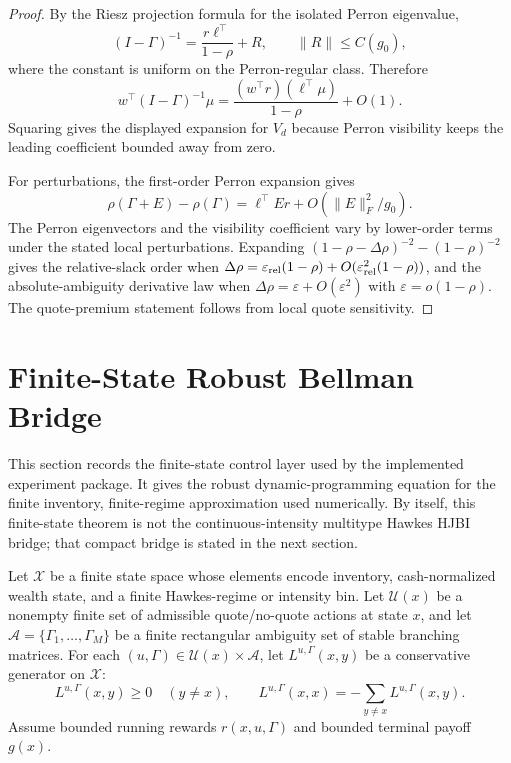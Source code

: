 \documentclass[11pt]{article}
\newcommand{\eps}{\varepsilon}
\begin{document}
\begin{proof}
By the Riesz projection formula for the isolated Perron eigenvalue,
\[
(I-\Gamma)^{-1}=\frac{r\ell^\top}{1-\rho}+R,
\qquad \|R\|\le C(g_0),
\]
where the constant is uniform on the Perron-regular class. Therefore
\[
w^\top(I-\Gamma)^{-1}\mu
=\frac{(w^\top r)(\ell^\top\mu)}{1-\rho}+O(1).
\]
Squaring gives the displayed expansion for $V_d$ because Perron visibility
keeps the leading coefficient bounded away from zero.

For perturbations, the first-order Perron expansion gives
\[
\rho(\Gamma+E)-\rho(\Gamma)
=\ell^\top E r+O(\|E\|_F^2/g_0).
\]
The Perron eigenvectors and the visibility coefficient vary by lower-order
terms under the stated local perturbations. Expanding
$(1-\rho-\Delta\rho)^{-2}-(1-\rho)^{-2}$ gives the relative-slack order when
$\Delta\rho=\eps_{\rm rel}(1-\rho)+O(\eps_{\rm rel}^2(1-\rho))$, and the
absolute-ambiguity derivative law when $\Delta\rho=\eps+O(\eps^2)$ with
$\eps=o(1-\rho)$. The quote-premium statement follows from local quote
sensitivity.
\end{proof}

\section{Finite-State Robust Bellman Bridge}

This section records the finite-state control layer used by the implemented
experiment package. It gives the robust dynamic-programming equation for the
finite inventory, finite-regime approximation used numerically. By itself, this
finite-state theorem is not the continuous-intensity multitype Hawkes HJBI
bridge; that compact bridge is stated in the next section.

Let $\mathcal X$ be a finite state space whose elements encode inventory,
cash-normalized wealth state, and a finite Hawkes-regime or intensity bin. Let
$\mathcal U(x)$ be a nonempty finite set of admissible quote/no-quote actions
at state $x$, and let $\mathcal A=\{\Gamma_1,\ldots,\Gamma_M\}$ be a finite
rectangular ambiguity set of stable branching matrices. For each
$(u,\Gamma)\in\mathcal U(x)\times\mathcal A$, let
$L^{u,\Gamma}(x,y)$ be a conservative generator on $\mathcal X$:
\[
L^{u,\Gamma}(x,y)\ge0\quad (y\ne x),
\qquad
L^{u,\Gamma}(x,x)=-\sum_{y\ne x}L^{u,\Gamma}(x,y).
\]
Assume bounded running rewards $r(x,u,\Gamma)$ and bounded terminal payoff
$g(x)$.
\end{document}
